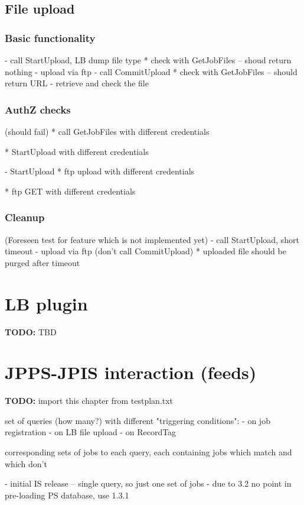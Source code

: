 \documentclass{egee}
\def\todo#1{\textbf{TODO:} #1}
\begin{document}
\subsection{File upload}

\subsubsection{Basic functionality}
- call StartUpload, LB dump file type
* check with GetJobFiles -- shoud return nothing
- upload via ftp
- call CommitUpload
* check with GetJobFiles -- should return URL
- retrieve and check the file

\subsubsection{AuthZ checks}
(should fail)
* call GetJobFiles with different credentials

* StartUpload with different credentials

- StartUpload
* ftp upload with different credentials

* ftp GET with different credentials

\subsubsection{Cleanup}
(Foreseen test for feature which is not implemented yet)
- call StartUpload, short timeout
- upload via ftp
(don't call CommitUpload)
* uploaded file should be purged after timeout

\section{LB plugin}
\todo{TBD}

\section{JPPS-JPIS interaction (feeds)}

\todo{import this chapter from testplan.txt}

set of queries (how many?) with different "triggering conditions":
- on job registration
- on LB file upload
- on RecordTag

corresponding sets of jobs to each query, each containing jobs which match
and which don't

- initial IS release -- single query, so just one set of jobs
- due to 3.2 no point in pre-loading PS database, use 1.3.1
\end{document}
